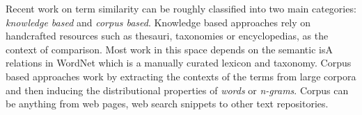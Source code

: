 

Recent work on term similarity can be roughly classified into two main categories: {\em knowledge based} and {\em corpus based}. Knowledge based
approaches rely on handcrafted resources such as thesauri, taxonomies or encyclopedias, as the context of comparison.  Most work in this space
\cite{Rada:1989, Resnik:1995, Agirre:2010} depends on the semantic isA relations in WordNet \cite{Miller1995} which is a manually curated
lexicon and taxonomy. Corpus based approaches work by extracting the contexts of the terms from large corpora and then inducing the
distributional properties of {\em words} or {\em
  n-grams}.
Corpus can be anything from web pages, web
search snippets to other text repositories.

